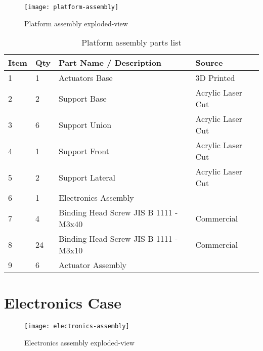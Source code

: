 
\begin{figure}
    \centering
    \texttt{[image: platform-assembly]}
    \caption{Platform assembly exploded-view}
    \label{fig:platform-assembly}
\end{figure}

\begin{table}[]
    \centering
    \caption{Platform assembly parts list}
    \label{tab:platform-assembly}
    \begin{tabular}{llll}
    \toprule
    Item & Qty & Part Name / Description & Source \\
    \midrule
    1 & 1 & Actuators Base & 3D Printed \\
    2 & 2 & Support Base & Acrylic Laser Cut \\
    3 & 6 & Support Union & Acrylic Laser Cut \\
    4 & 1 & Support Front & Acrylic Laser Cut \\
    5 & 2 & Support Lateral & Acrylic Laser Cut \\
    6 & 1 & Electronics Assembly & \\
    7 & 4 & Binding Head Screw JIS B 1111 - M3x40 & Commercial \\
    8 & 24 & Binding Head Screw JIS B 1111 - M3x10 & Commercial \\
    9 & 6 & Actuator Assembly & \\
    \bottomrule
    \end{tabular}
\end{table}


\section{Electronics Case}

\begin{figure}
    \centering
    \texttt{[image: electronics-assembly]}
    \caption{Electronics assembly exploded-view}
    \label{fig:electronics-assembly}
\end{figure}

